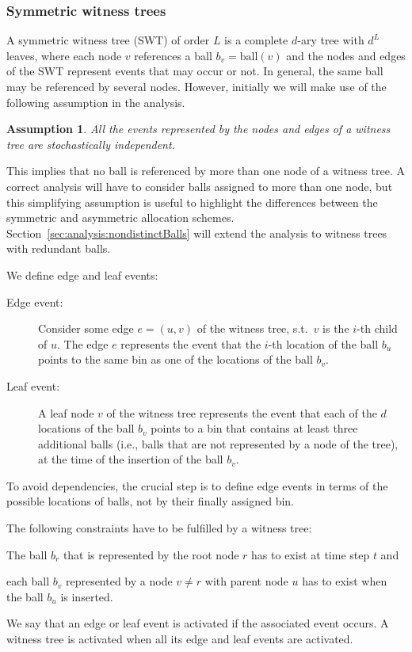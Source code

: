 \documentclass[a4paper,12pt]{article}
\newtheorem{assumption}{Assumption}
\begin{document}
\subsubsection{Symmetric witness trees}
\label{sec:analysis:definitionSymWT}
A symmetric witness tree (SWT) of order $L$ is a complete $d$-ary tree with $d^{L}$ leaves, where each node $v$ references a ball $b_v = \mathrm{ball}(v)$ and the nodes and edges of the SWT represent events that may occur or not. In general, the same ball may be referenced by several nodes. However, initially we will make use of the following assumption in the analysis.
\begin{assumption}
\label{assumption:independence}
All the events represented by the nodes and edges of a witness tree are stochastically independent. 
\end{assumption} 
\noindent
This implies that no ball is referenced by more than one node of a witness tree. A correct analysis will have to consider balls assigned to more than one node, but this simplifying assumption is useful to highlight the differences between the symmetric and asymmetric allocation schemes. Section~\ref{sec:analysis:nondistinctBalls} will extend the analysis to witness trees with redundant balls.

We define edge and leaf events:
\begin{description}
\item [Edge event:] Consider some edge $e = (u,v)$ of the witness tree, s.t.~$v$ is the $i$-th child of $u$. The edge $e$ represents the event that the $i$-th location of the ball $b_u$ points to the same bin as one of the locations of the ball $b_v$. 
\item [Leaf event:] A leaf node $v$ of the witness tree represents the event that each of the $d$ locations of the ball $b_v$ points to a bin that contains at least three additional balls (i.e., balls that are not represented by a node of the tree), at the time of the insertion of the ball $b_v$.
\end{description}
To avoid dependencies, the crucial step is to define edge events in terms of the possible locations of balls, not by their finally assigned bin. 

The following constraints have to be fulfilled by a witness tree:
\begin{inparaenum}[(i)]
\item The ball $b_r$ that is represented by the root node $r$ has to exist at time step $t$ and 
\item each ball $b_v$ represented by a node $v \neq r$ with parent node $u$ has to exist when the ball $b_u$ is inserted.
\end{inparaenum}
We say that an edge or leaf event is activated if the associated event occurs. A witness tree is activated when all its edge and leaf events are activated. 
\end{document}
